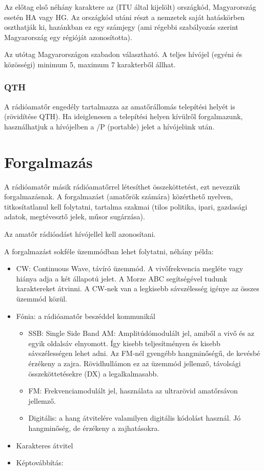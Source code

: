 \documentclass[12pt,a4paper]{article}
\begin{document}
Az előtag első néhány karaktere az (ITU által kijelölt) országkód, Magyarország esetén HA vagy HG. Az országkód utáni részt a nemzetek saját hatáskörben oszthatják ki, hazánkban ez egy számjegy (ami régebbi szabályozás szerint Magyarország egy régióját azonosította).

Az utótag Magyarországon szabadon választható. A teljes hívójel (egyéni és közösségi) minimum 5, maximum 7 karakterből állhat.

\subsubsection{QTH}

A rádióamatőr engedély tartalmazza az amatőrállomás telepítési helyét is (rövidítése QTH). Ha ideiglenesen a telepítési helyen kívülről forgalmazunk, használhatjuk a hívójelben a /P (portable) jelet a hívójelünk után.

\section{Forgalmazás}

A rádióamatőr másik rádióamatőrrel létesíthet összeköttetést, ezt nevezzük forgalmazásnak. A forgalmazást (amatőrök számára) közérthető nyelven, titkosítatlanul kell folytatni, tartalma szakmai (tilos politika, ipari, gazdasági adatok, megtévesztő jelek, műsor sugárzása).

Az amatőr rádióadást hívójellel kell azonosítani.

A forgalmazást sokféle üzemmódban lehet folytatni, néhány példa:

\begin{itemize}
\item CW: Continuous Wave, távíró üzemmód. A vivőfrekvencia megléte vagy hiánya adja a két állapotú jelet. A Morze ABC segítségével tudunk karaktereket átvinni. A CW-nek van a legkisebb sávszélesség igénye az összes üzemmód közül.
\item Fónia: a rádióamatőr beszéddel kommunikál
\begin{itemize}
\item SSB: Single Side Band AM: Amplitúdómodulált jel, amiből a vivő és az egyik oldalsáv elnyomott. Így kisebb teljesítményen és kisebb sávszélességen lehet adni. Az FM-nél gyengébb hangminőségű, de kevésbé érzékeny a zajra. Rövidhullámon ez az üzemmód jellemző, távolsági összeköttetésekre (DX) a legalkalmasabb.
\item FM: Frekvenciamodulált jel, használata az ultrarövid amatőrsávon jellemző.
\item Digitális: a hang átvitelére valamilyen digitális kódolást használ. Jó hangminőség, de érzékeny a zajhatásokra.
\end{itemize}
\item Karakteres átvitel
\item Képtovábbítás: 
\end{itemize}
\end{document}
